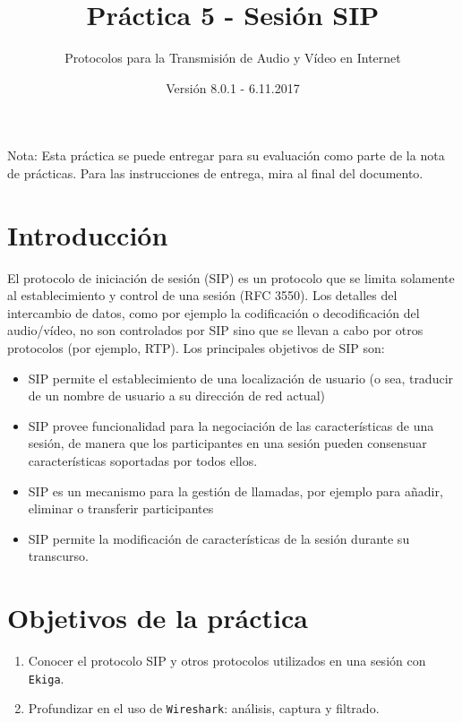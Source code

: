 \documentclass[11pt,a4paper]{article}
\begin{document}
\title{Práctica 5 - Sesión SIP}
\author{Protocolos para la Transmisión de Audio y Vídeo en Internet}
\date{Versión 8.0.1 - 6.11.2017}


\maketitle

Nota: Esta práctica se puede entregar para su evaluación como parte de la nota de prácticas. Para las instrucciones de entrega, mira al final del documento. 

\section{Introducción}

El protocolo de iniciación de sesión (SIP) es un protocolo que se limita solamente al establecimiento y control de una sesión (RFC 3550). Los detalles del intercambio de datos, como por ejemplo la codificación o decodificación del audio/vídeo, no son controlados por SIP sino que se llevan a cabo por otros protocolos (por ejemplo, RTP). Los principales objetivos de SIP son:

\begin{itemize}
  \item SIP permite el establecimiento de una localización de usuario (o sea, traducir de un nombre de usuario a su dirección de red actual)
  \item SIP provee funcionalidad para la negociación de las características de una sesión, de manera que los participantes en una sesión pueden consensuar características soportadas por todos ellos.
  \item SIP es un mecanismo para la gestión de llamadas, por ejemplo para añadir, eliminar o transferir participantes
  \item SIP permite la modificación de características de la sesión durante su transcurso.
\end{itemize}

\section{Objetivos de la práctica}

\begin{enumerate}
  \item Conocer el protocolo SIP y otros protocolos utilizados en una sesión con \texttt{Ekiga}.
  \item Profundizar en el uso de \texttt{Wireshark}: análisis, captura y filtrado.
\end{enumerate}
\end{document}
